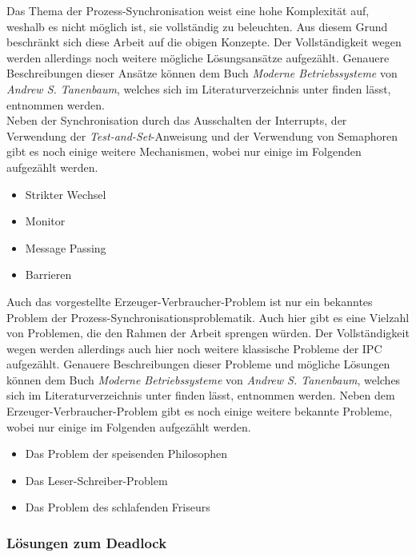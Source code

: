 \begin{description}
						Das Thema der Prozess-Synchronisation weist eine hohe Komplexität auf, weshalb es nicht möglich ist, sie vollständig zu beleuchten. Aus diesem Grund beschränkt sich diese Arbeit auf die obigen Konzepte. Der Vollständigkeit wegen werden allerdings noch weitere mögliche Lösungsansätze aufgezählt. Genauere Beschreibungen dieser Ansätze können dem Buch \textit{Moderne Betriebssysteme} von \textit{Andrew S. Tanenbaum}, welches sich im Literaturverzeichnis unter \cite{ModerneBetriebssysteme} finden lässt, entnommen werden.\\
						Neben der Synchronisation durch das Ausschalten der Interrupts, der Verwendung der \textit{Test-and-Set}-Anweisung und der Verwendung von Semaphoren gibt es noch einige weitere Mechanismen, wobei nur einige im Folgenden aufgezählt werden.
						
						\begin{itemize}
							\item Strikter Wechsel
							\item Monitor
							\item Message Passing
							\item Barrieren
						\end{itemize}
					
						Auch das vorgestellte Erzeuger-Verbraucher-Problem ist nur ein bekanntes Problem der Prozess-Synchronisationsproblematik. Auch hier gibt es eine Vielzahl von Problemen, die den Rahmen der Arbeit sprengen würden. Der Vollständigkeit wegen werden allerdings auch hier noch weitere klassische Probleme der IPC aufgezählt. Genauere Beschreibungen dieser Probleme und mögliche Lösungen können dem Buch \textit{Moderne Betriebssysteme} von \textit{Andrew S. Tanenbaum}, welches sich im Literaturverzeichnis unter \cite{ModerneBetriebssysteme} finden lässt, entnommen werden.
						Neben dem Erzeuger-Verbraucher-Problem gibt es noch einige weitere bekannte Probleme, wobei nur einige im Folgenden aufgezählt werden.
						
						\begin{itemize}
							\item Das Problem der speisenden Philosophen
							\item Das Leser-Schreiber-Problem
							\item Das Problem des schlafenden Friseurs
						\end{itemize}
				\end{description}
			
			\subsubsection{Lösungen zum Deadlock}
			
